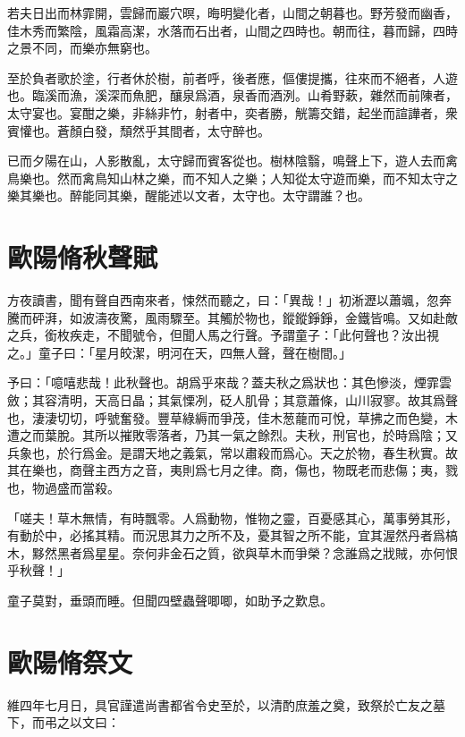若夫日出而林霏開，雲歸而巖穴暝，晦明變化者，山間之朝暮也。野芳發而幽香，佳木秀而繁陰，風霜高潔，水落而石出者，山間之四時也。朝而往，暮而歸，四時之景不同，而樂亦無窮也。

至於負者歌於塗，行者休於樹，前者呼，後者應，傴僂提攜，往來而不絕者，人遊也。臨溪而漁，溪深而魚肥，釀泉爲酒，泉香而酒洌。山肴野蔌，雜然而前陳者，太守宴也。宴酣之樂，非絲非竹，射者中，奕者勝，觥籌交錯，{起坐}而諠譁者，衆賓懽也。蒼顏白發，頹然乎其間者，太守醉也。%

已而夕陽在山，人影散亂，太守歸而賓客從也。樹林陰翳，鳴聲上下，遊人去而禽鳥樂也。然而禽鳥知山林之樂，而不知人之樂；人知從太守遊而樂，而不知太守之樂其樂也。醉能同其樂，醒能述以文者，太守也。太守謂誰？也。

\section[秋聲賦\quad{\small 歐陽脩}]{{\normalsize 歐陽脩}\quad 秋聲賦}
方夜讀書，聞有聲自西南來者，悚然而聽之，曰：「異哉！」初淅瀝以蕭颯，忽奔騰而砰湃，如波濤夜驚，風雨驟至。其觸於物也，鏦鏦錚錚，金鐵皆鳴。又如赴敵之兵，銜枚疾走，不聞號令，但聞人馬之行聲。予謂童子：「此何聲也？汝出視之。」童子曰：「星月皎潔，明河在天，四無人聲，聲在樹間。」

予曰：「噫嘻悲哉！此秋聲也。胡爲{乎}來哉？蓋夫秋之爲狀也：其色慘淡，煙霏雲斂；其容清明，天高日晶；其氣慄冽，砭人肌骨；其意蕭條，山川寂寥。故其爲聲也，淒淒切切，呼號奮發。豐草綠縟而爭茂，佳木葱蘢而可悅，草拂之而色變，木遭之而葉脫。其所以摧敗零落者，乃其一氣之餘烈。夫秋，刑官也，於時爲陰；又兵象也，於行爲金。是謂天地之義氣，常以肅殺而爲心。天之於物，春生秋實。故其在樂也，商聲主西方之音，夷則爲七月之律。商，傷也，物既老而悲傷；夷，戮也，物過盛而當殺。%

「嗟夫！草木無情，有時飄零。人爲動物，惟物之靈，百憂感其心，萬事勞其形，有動於中，必搖其精。而況思其力之所不及，憂其智之所不能，宜其渥然丹者爲槁木，黟然黑者爲星星。奈何非金石之質，欲與草木而爭榮？念誰爲之戕賊，亦何恨乎秋聲！」

童子莫對，垂頭而睡。但聞四壁蟲聲唧唧，如助予之歎息。

\theendnotes

\section[祭石曼卿文\quad{\small 歐陽脩}]{{\normalsize 歐陽脩}\quad 祭文}
維四年七月日，具官謹遣尚書都省令史至於，以清酌庶羞之奠，致祭於亡友之墓下，而弔之以文曰：

